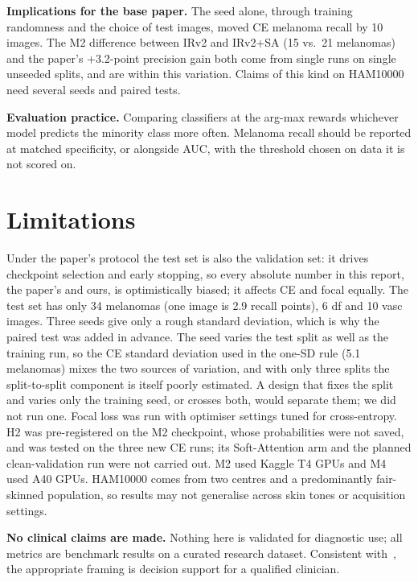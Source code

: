 \documentclass[conference]{IEEEtran}
\begin{document}
\textbf{Implications for the base paper.} The seed alone, through training randomness and the choice of test images, moved CE melanoma recall by 10 images. The M2 difference between IRv2 and IRv2+SA (15 vs.\ 21 melanomas) and the paper's +3.2-point precision gain both come from single runs on single unseeded splits, and are within this variation. Claims of this kind on HAM10000 need several seeds and paired tests.

\textbf{Evaluation practice.} Comparing classifiers at the arg-max rewards whichever model predicts the minority class more often. Melanoma recall should be reported at matched specificity, or alongside AUC, with the threshold chosen on data it is not scored on.

\section{Limitations}\label{sec:limits}
Under the paper's protocol the test set is also the validation set: it drives checkpoint selection and early stopping, so every absolute number in this report, the paper's and ours, is optimistically biased; it affects CE and focal equally. The test set has only 34 melanomas (one image is 2.9 recall points), 6 df and 10 vasc images. Three seeds give only a rough standard deviation, which is why the paired test was added in advance. The seed varies the test split as well as the training run, so the CE standard deviation used in the one-SD rule (5.1 melanomas) mixes the two sources of variation, and with only three splits the split-to-split component is itself poorly estimated. A design that fixes the split and varies only the training seed, or crosses both, would separate them; we did not run one. Focal loss was run with optimiser settings tuned for cross-entropy. H2 was pre-registered on the M2 checkpoint, whose probabilities were not saved, and was tested on the three new CE runs; its Soft-Attention arm and the planned clean-validation run were not carried out. M2 used Kaggle T4 GPUs and M4 used A40 GPUs. HAM10000 comes from two centres and a predominantly fair-skinned population, so results may not generalise across skin tones or acquisition settings.

\textbf{No clinical claims are made.} Nothing here is validated for diagnostic use; all metrics are benchmark results on a curated research dataset. Consistent with~\cite{tschandl2020}, the appropriate framing is decision support for a qualified clinician.
\end{document}
